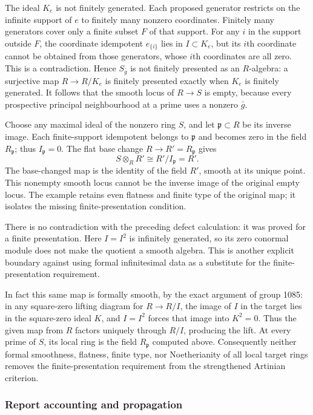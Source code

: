 The ideal \(K_e\) is not finitely generated. Each proposed generator restricts on the infinite support of \(e\) to finitely many nonzero coordinates. Finitely many generators cover only a finite subset \(F\) of that support. For any \(i\) in the support outside \(F\), the coordinate idempotent \(e_{\{i\}}\) lies in \(I\subset K_e\), but its \(i\)th coordinate cannot be obtained from those generators, whose \(i\)th coordinates are all zero. This is a contradiction. Hence \(S_{\bar g}\) is not finitely presented as an \(R\)-algebra: a surjective map \(R\to R/K_e\) is finitely presented exactly when \(K_e\) is finitely generated. It follows that the smooth locus of \(R\to S\) is empty, because every prospective principal neighbourhood at a prime uses a nonzero \(\bar g\).

Choose any maximal ideal of the nonzero ring \(S\), and let \(\mathfrak p\subset R\) be its inverse image. Each finite-support idempotent belongs to \(\mathfrak p\) and becomes zero in the field \(R_{\mathfrak p}\); thus \(I_{\mathfrak p}=0\). The flat base change \(R\to R'=R_{\mathfrak p}\) gives \[
S\otimes_RR'\cong R'/I_{\mathfrak p}=R'.
\] The base-changed map is the identity of the field \(R'\), smooth at its unique point. This nonempty smooth locus cannot be the inverse image of the original empty locus. The example retains even flatness and finite type of the original map; it isolates the missing finite-presentation condition.

There is no contradiction with the preceding defect calculation: it was proved for a finite presentation. Here \(I=I^2\) is infinitely generated, so its zero conormal module does not make the quotient a smooth algebra. This is another explicit boundary against using formal infinitesimal data as a substitute for the finite-presentation requirement.

In fact this same map is formally smooth, by the exact argument of group 1085: in any square-zero lifting diagram for \(R\to R/I\), the image of \(I\) in the target lies in the square-zero ideal \(K\), and \(I=I^2\) forces that image into \(K^2=0\). Thus the given map from \(R\) factors uniquely through \(R/I\), producing the lift. At every prime of \(S\), its local ring is the field \(R_{\mathfrak p}\) computed above. Consequently neither formal smoothness, flatness, finite type, nor Noetherianity of all local target rings removes the finite-presentation requirement from the strengthened Artinian criterion.

\subsubsection{Report accounting and propagation}\label{report-accounting-and-propagation}

